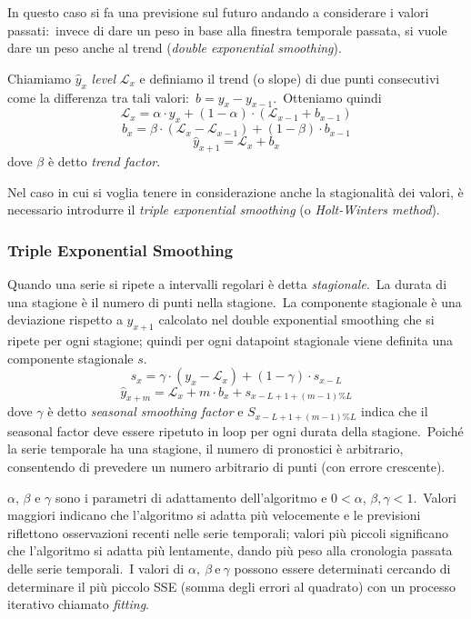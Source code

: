 \vspace{12pt}
\noindent In questo caso si fa una previsione sul futuro andando a considerare i valori passati:\ invece di dare un peso in base alla finestra temporale passata, si vuole dare un peso anche al trend (\textit{double exponential smoothing}).

Chiamiamo $\hat{y}_x$ \textit{level} $\mathcal{L}_x$ e definiamo il trend (o slope) di due punti consecutivi come la differenza tra tali valori:\ $b = y_x - y_{x-1}$.\
Otteniamo quindi
\[\mathcal{L}_x = \alpha\cdot y_x + (1-\alpha)\cdot(\mathcal{L}_{x-1} + b_{x-1})\]
\[b_x = \beta\cdot(\mathcal{L}_x - \mathcal{L}_{x-1}) + (1-\beta)\cdot b_{x-1}\]
\[\hat{y}_{x+1} = \mathcal{L}_x + b_x\]
dove $\beta$ è detto \textit{trend factor}.

Nel caso in cui si voglia tenere in considerazione anche la stagionalità dei valori, è necessario introdurre il \textit{triple exponential smoothing} (o \textit{Holt-Winters method}).\

\subsubsection{Triple Exponential Smoothing}

Quando una serie si ripete a intervalli regolari è detta \textit{stagionale}.\
La durata di una stagione è il numero di punti nella stagione.\
La componente stagionale è una deviazione rispetto a $\hat{y}_{x+1}$ calcolato nel double exponential smoothing che si ripete per ogni stagione; quindi per ogni datapoint stagionale viene definita una componente stagionale $s$.
\[s_x = \gamma\cdot(y_x - \mathcal{L}_x) + (1-\gamma)\cdot s_{x-L} \]
\[\hat{y}_{x+m} = \mathcal{L}_x + m\cdot b_x + s_{x-L+1+(m-1)\%L}\]
dove $\gamma$ è detto \textit{seasonal smoothing factor} e $S_{x-L+1+(m-1)\%L}$ indica che il seasonal factor deve essere ripetuto in loop per ogni durata della stagione.\
Poiché la serie temporale ha una stagione, il numero di pronostici è arbitrario, consentendo di prevedere un numero arbitrario di punti (con errore crescente).\

$\alpha$, $\beta$ e $\gamma$ sono i parametri di adattamento dell'algoritmo e $0 < \alpha$, $\beta, \gamma < 1$.\
Valori maggiori indicano che l'algoritmo si adatta più velocemente e le previsioni riflettono osservazioni recenti nelle serie temporali; valori più piccoli significano che l'algoritmo si adatta più lentamente, dando più peso alla cronologia passata delle serie temporali.\
I valori di $\alpha,\ \beta\ \mathrm{e}\ \gamma$ possono essere determinati cercando di determinare il più piccolo SSE (somma degli errori al quadrato) con un processo iterativo chiamato \textit{fitting}.\

